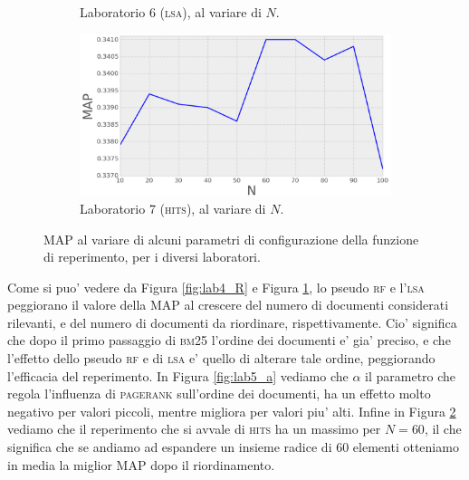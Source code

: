 \begin{figure}
\begin{subfigure}[htpb]{0.475\textwidth}
		\caption[]%
		{{\small Laboratorio 6 (\textsc{lsa}), al variare di $N$.}}    
		\label{fig:lab6_Nd}
	\end{subfigure}
	\quad
	\begin{subfigure}[htpb]{0.475\textwidth}   
		\centering 
		\includegraphics[width=\textwidth]{figures/lab7_N.png}
		\caption[]%
		{{\small Laboratorio 7 (\textsc{hits}), al variare di $N$.}}    
		\label{fig:lab7_Nd}
	\end{subfigure}
        \caption[ The average and standard deviation of claboratorioritical parameters ]
        {\small MAP al variare di alcuni parametri di configurazione della funzione di reperimento, per i diversi laboratori.} 
        \label{fig:map_all}
\end{figure}
Come si puo' vedere da Figura \ref{fig:lab4_R} e Figura \ref{fig:lab6_Nd}, lo pseudo \textsc{rf} e l'\textsc{lsa} peggiorano il valore della MAP al crescere del numero di documenti considerati rilevanti, e del numero di documenti da riordinare, rispettivamente. Cio' significa che dopo il primo passaggio di \textsc{bm25} l'ordine dei documenti e' gia' preciso, e che l'effetto dello pseudo \textsc{rf} e di \textsc{lsa} e' quello di alterare tale ordine, peggiorando l'efficacia del reperimento. In Figura \ref{fig:lab5_a} vediamo che $\alpha$ il parametro che regola l'influenza di \textsc{pagerank} sull'ordine dei documenti, ha un effetto molto negativo per valori piccoli, mentre migliora per valori piu' alti. Infine in Figura \ref{fig:lab7_Nd} vediamo che il reperimento che si avvale di \textsc{hits} ha un massimo per $N=60$, il che significa che se andiamo ad espandere un insieme radice di 60 elementi otteniamo in media la miglior MAP dopo il riordinamento.

